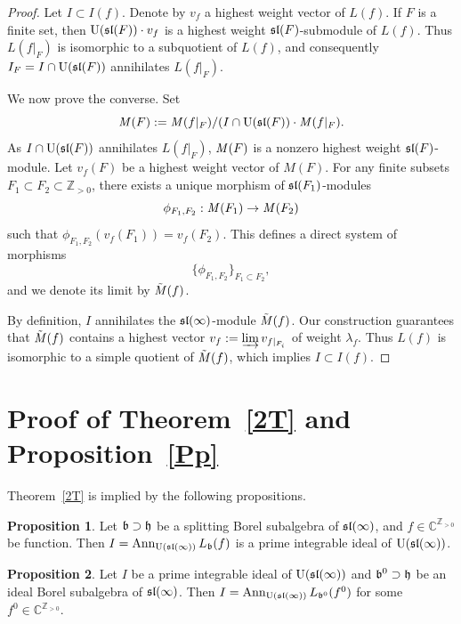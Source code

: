 \documentclass[10pt]{amsart}\oddsidemargin -1mm \evensidemargin -1mm \topmargin -15mm\headheight5mm \headsep 3.5mm \textheight 245mm\textwidth 170mm %
\theoremstyle{definition}\newtheorem{theorem}{Theorem}[section]\newtheorem{lemma}[theorem]{Lemma}\newtheorem{remark}[theorem]{Remark}\newtheorem{proposition}[theorem]{Proposition}\newtheorem{corollary}[theorem]{Corollary}\newtheorem{definition}[theorem]{Definition}\newtheorem{Ex}[theorem]{Example}
\begin{document}
\begin{proof}%
Let $I\subset I(f)$. Denote by $v_f$ a highest weight vector of $L(f)$. If $F$ is a finite set, then $\operatorname{\mathrm{U}}(\frak{sl}(F))\cdot v_f$ is a highest weight $\frak{sl}(F)$-submodule of $L(f)$. Thus $L(f|_F)$ is isomorphic to a subquotient of  $L(f)$, and consequently $I_F=I\cap\operatorname{\mathrm{U}}(\frak{sl}(F))$ annihilates $L(f|_F)$.

We now prove the converse. Set $$\operatorname{{\it M}}(F):=\operatorname{{\it M}}(f|_F)/(I\cap\operatorname{\mathrm{U}}(\frak{sl}(F))\cdot\operatorname{{\it M}}(f|_F).$$As $I\cap\operatorname{\mathrm{U}}(\frak{sl}(F))$ annihilates $L(f|_F)$, $\operatorname{{\it M}}(F)$ is a nonzero highest weight $\frak{sl}(F)$-module. Let $v_f(F)$ be a highest weight vector of $M(F)$. For any finite subsets $F_1\subset F_2\subset\mathbb Z_{>0}$, there exists a unique morphism of $\frak{sl}(F_1)$-modules$$\phi_{F_1, F_2}: \operatorname{{\it M}}(F_1)\to\operatorname{{\it M}}(F_2)$$such that
$\phi_{F_1, F_2}(v_f(F_1))=v_f(F_2)$. This defines a direct
system of morphisms $$\{\phi_{F_1, F_2}\}_{F_1\subset F_2},$$ and we denote its limit by $\tilde{\operatorname{{\it M}}}(f)$.

By definition, $I$ annihilates the $\frak{sl}(\infty)$-module $\tilde{\operatorname{{\it M}}}(f)$. Our construction guarantees that $\tilde {\operatorname{{\it M}}}(f)$ contains a highest
vector $v_f:=\varinjlim v_{f|_{F_i}}$ of weight $\lambda_f$. Thus $L(f)$ is isomorphic to a
simple quotient of $\tilde {\operatorname{{\it M}}}(f)$, which implies $I\subset I(f)$.\end{proof}

\section{Proof of Theorem~\ref{2T} and Proposition~\ref{Pp}}\label{Spr2t}
Theorem~\ref{2T} is implied by the following propositions.

\begin{proposition}\label{Pint}Let $\frak b\supset\frak h$ be a splitting Borel subalgebra of $\frak{sl}(\infty)$, and $f\in\mathbb C^{\mathbb Z_{>0}}$ be function. Then $I=\operatorname{\mathrm{Ann}}_{\operatorname{\mathrm{U}}(\frak{sl}(\infty))} L_{\frak b}(f)$ is a prime integrable ideal of $\operatorname{\mathrm{U}}(\frak{sl}(\infty))$.\end{proposition}
\begin{proposition}\label{Piint}Let $I$ be a prime integrable ideal of $\operatorname{\mathrm{U}}(\frak{sl}(\infty))$ and $\frak b^0\supset\frak h$ be an ideal Borel subalgebra of $\frak{sl}(\infty)$. Then $I=\operatorname{\mathrm{Ann}}_{\operatorname{\mathrm{U}}(\frak{sl}(\infty))} L_{\frak b^0}(f^0)$ for some $f^0\in\mathbb C^{\mathbb Z_{>0}}$.\end{proposition}
\end{document}
